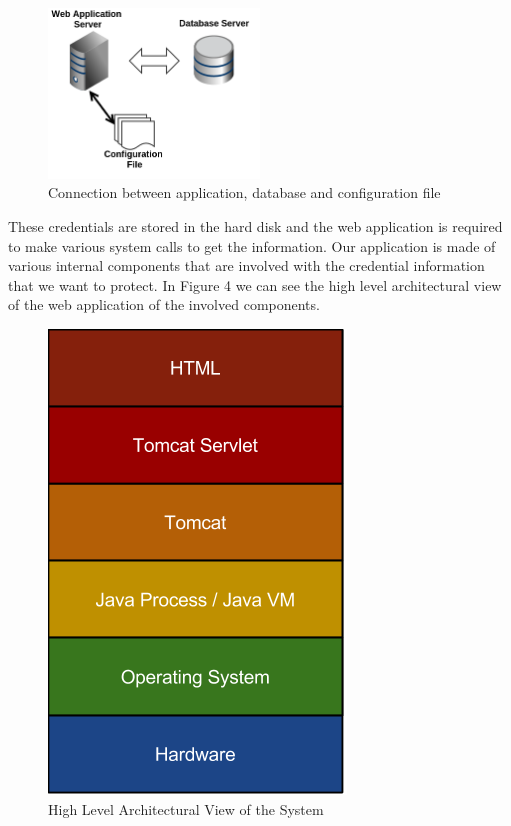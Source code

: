 \documentclass[11pt, a4paper, twoside, notitlepage]{article}
\begin{document}
\begin{figure}[h!]
    \centering
    \includegraphics[width=0.5\textwidth]{config}
    \caption{Connection between application, database and configuration file}
\end{figure}

These credentials are stored in the hard disk and the web application is required to make various system calls to get the information. Our application is made of various internal components that are involved with the credential  information that we want to protect. In Figure 4 we can see the high level architectural view of the web application of the involved components. 

\begin{figure}[h!]
    \centering
    \includegraphics[height=0.2\paperheight]{high-level-archecuture}
    \caption{High Level Architectural View of the System}
\end{figure}
\end{document}
